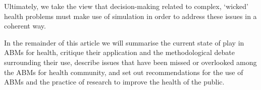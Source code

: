 \documentclass[review]{elsarticle}
\begin{document}
Ultimately, we take the view that decision-making related to complex, `wicked' health problems must make use of simulation in order to address these issues in a coherent way. 

  


In the remainder of this article we will summarise the current state of play in ABMs for health, critique their application and the methodological debate surrounding their use, describe issues that have been missed or overlooked among the ABMs for health community, and set out recommendations for the use of ABMs and the practice of research to improve the health of the public.
\end{document}
